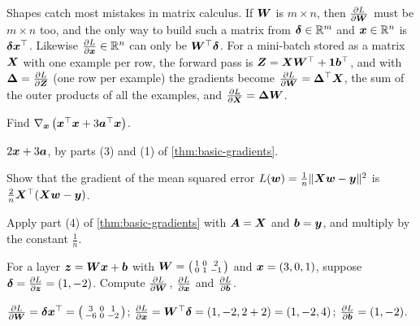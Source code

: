 \begin{remark}
Shapes catch most mistakes in matrix calculus. If $\bm{W}$ is $m\times n$, then
$\frac{\partial L}{\partial \bm{W}}$ must be $m\times n$ too, and the only way to build such a matrix
from $\bm{\delta} \in \mathbb{R}^m$ and $\bm{x} \in \mathbb{R}^n$ is $\bm{\delta}\bm{x}^\top$. Likewise
$\frac{\partial L}{\partial \bm{x}} \in \mathbb{R}^n$ can only be $\bm{W}^\top\bm{\delta}$. For a mini-batch stored
as a matrix $\bm{X}$ with one example per row, the forward pass is
$\bm{Z} = \bm{X}\bm{W}^\top + \bm{1}\bm{b}^\top$, and with $\bm{\Delta} = \frac{\partial L}{\partial \bm{Z}}$ (one
row per example) the gradients become $\frac{\partial L}{\partial \bm{W}} = \bm{\Delta}^\top\bm{X}$,
the sum of the outer products of all the examples, and
$\frac{\partial L}{\partial \bm{X}} = \bm{\Delta}\bm{W}$.
\end{remark}

\sectionexercises

\begin{exercise}
Find $\nabla_{\bm{x}}\left(\bm{x}^\top\bm{x} + 3\bm{a}^\top\bm{x}\right)$.
\end{exercise}
\begin{solution}
$2\bm{x} + 3\bm{a}$, by parts (3) and (1) of \cref{thm:basic-gradients}.
\end{solution}

\begin{exercise}
Show that the gradient of the mean squared error
$L(\bm{w}) = \frac1n\lVert\bm{X}\bm{w} - \bm{y}\rVert^2$ is $\frac2n\bm{X}^\top(\bm{X}\bm{w} - \bm{y})$.
\end{exercise}
\begin{solution}
Apply part (4) of \cref{thm:basic-gradients} with $\bm{A} = \bm{X}$ and $\bm{b} = \bm{y}$,
and multiply by the constant $\tfrac1n$.
\end{solution}

\begin{exercise}
For a layer $\bm{z} = \bm{W}\bm{x} + \bm{b}$ with $\bm{W} = \left(\begin{smallmatrix} 1 & 0 & 2\\
0 & 1 & -1\end{smallmatrix}\right)$ and $\bm{x} = (3, 0, 1)$, suppose
$\bm{\delta} = \frac{\partial L}{\partial \bm{z}} = (1, -2)$. Compute $\frac{\partial L}{\partial \bm{W}}$, $\frac{\partial L}{\partial \bm{x}}$
and $\frac{\partial L}{\partial \bm{b}}$.
\end{exercise}
\begin{solution}
$\frac{\partial L}{\partial \bm{W}} = \bm{\delta}\bm{x}^\top = \left(\begin{smallmatrix} 3 & 0 & 1\\ -6 & 0 &
-2\end{smallmatrix}\right)$; $\frac{\partial L}{\partial \bm{x}} = \bm{W}^\top\bm{\delta} = (1, -2, 2 + 2) = (1,
-2, 4)$; $\frac{\partial L}{\partial \bm{b}} = (1, -2)$.
\end{solution}

